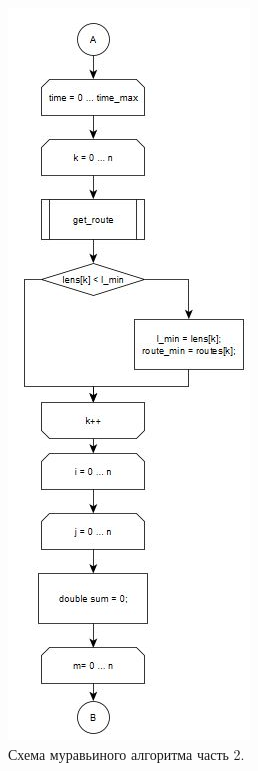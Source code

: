 \documentclass[12pt]{report}
\begin{document}
	\begin{figure}[H]
		\begin{center}
			\includegraphics[scale=1]{img/formic2.png}
			\caption{Схема муравьиного алгоритма часть 2.}
			\label{fig:formic2}
		\end{center}
	\end{figure}
	
\end{document}
